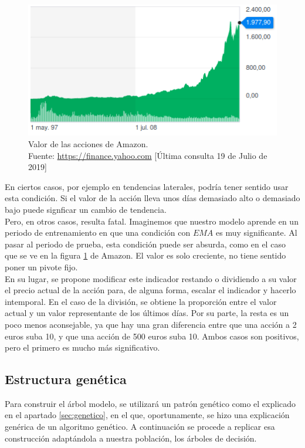  
 		\begin{figure}[H]
    		\centering
    		\includegraphics[scale=0.7]{imagenes/amazon.png}
    	    \caption[Valor de las acciones de Amazon en un periodo concreto]{Valor de las acciones de Amazon.\\ Fuente: \url{https://finance.yahoo.com} [\'Ultima consulta 19 de Julio de 2019]}
    		\label{fig:amazon}
	   \end{figure}
	   
En ciertos casos, por ejemplo en tendencias laterales, podr\'ia tener sentido usar esta condici\'on. Si el valor de la acci\'on lleva unos d\'ias demasiado alto o demasiado bajo puede signficar un cambio de tendencia.\\

Pero, en otros casos, resulta fatal. Imaginemos que nuestro modelo aprende en un periodo de entrenamiento en que una condici\'on con $EMA$ es muy significante. Al pasar al periodo de prueba, esta condici\'on puede ser absurda, como en el caso que se ve en la figura \ref{fig:amazon} de Amazon. El valor es solo creciente, no tiene sentido poner un pivote fijo.\\

En su lugar, se propone modificar este indicador restando o dividiendo a su valor el precio actual de la acci\'on para, de alguna forma, escalar el indicador y hacerlo intemporal. En el caso de la divisi\'on, se obtiene la proporci\'on entre el valor actual y un valor representante de los \'ultimos d\'ias. Por su parte, la resta es un poco menos aconsejable, ya que hay una gran diferencia entre que una acci\'on a 2 euros suba 10, y que una acci\'on de 500 euros suba 10. Ambos casos son positivos, pero el primero es mucho m\'as significativo. \\


\subsection{Estructura gen\'etica}
Para construir el \'arbol modelo, se utilizar\'a un patr\'on gen\'etico como el explicado en el apartado \ref{sec:genetico}, en el que, oportunamente, se hizo una explicaci\'on gen\'erica de un algoritmo gen\'etico. A continuaci\'on se procede a replicar esa construcci\'on adapt\'andola a nuestra poblaci\'on, los \'arboles de decisi\'on.\\

